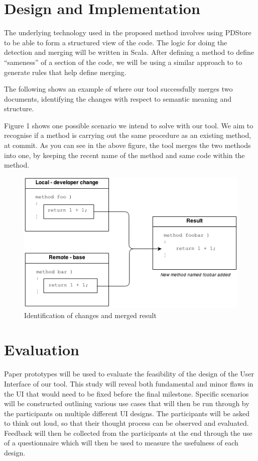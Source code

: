 \documentclass[11pt,twocolumn]{article}
\begin{document}
\section{Design and Implementation}

The underlying technology used in the proposed method involves using
PDStore to be able to form a structured view of the code. The logic
for doing the detection and merging will be written in Scala. After
defining a method to define “sameness” of a section of the code, we
will be using a similar approach to \cite{XMLMerge} to generate rules
that help define merging.

The following shows an example of where our tool successfully merges
two documents, identifying the changes with respect to semantic meaning
and structure.

Figure 1 shows one possible scenario we intend to solve with our tool.
We aim to recognise if a method is carrying out the same procedure
as an existing method, at commit. As you can see in the above figure,
the tool merges the two methods into one, by keeping the recent name
of the method and same code within the method.

\begin{figure}
\includegraphics[scale=0.47]{IdentificationOfChanges}\caption{Identification of changes and merged result}
\end{figure}



\section{Evaluation}

Paper prototypes will be used to evaluate the feasibility of the design
of the User Interface of our tool. This study will reveal both fundamental
and minor flaws in the UI that would need to be fixed before the final
milestone. Specific scenarios will be constructed outlining various
use cases that will then be run through by the participants on multiple
different UI designs. The participants will be asked to think out
loud, so that their thought process can be observed and evaluated.
Feedback will then be collected from the participants at the end through
the use of a questionnaire which will then be used to measure the
usefulness of each design.
\end{document}
